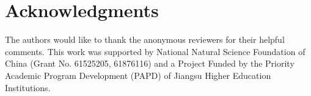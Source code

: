 \documentclass{article}
\begin{document}
%
 
\section*{Acknowledgments}

The authors would like to thank the anonymous reviewers for their helpful comments.
This work was supported by National Natural Science Foundation of China (Grant No. 61525205, 61876116) and a Project Funded by the Priority Academic Program Development (PAPD) of Jiangsu Higher Education Institutions.


\end{document}
